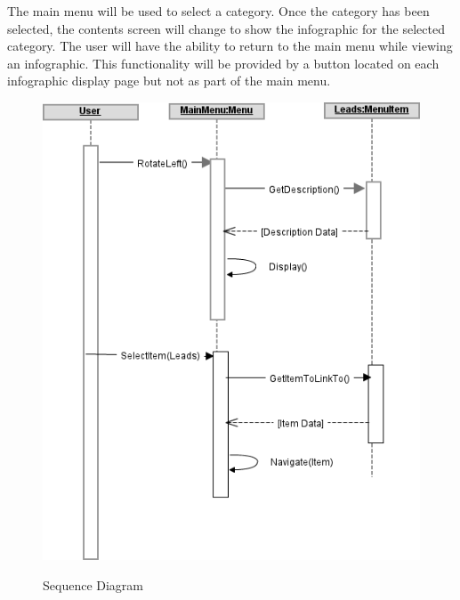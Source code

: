 \documentclass[11pt,a4paper,oneside]{article}
\begin{document}
The main menu will be used to select a category.  Once the category has been selected, the contents screen will change to show the infographic for the selected category.  The user will have the ability to return to the main menu while viewing an infographic.  This functionality will be provided by a button located on each infographic display page but not as part of the main menu.\\

\begin{figure}[!]
\caption{Sequence Diagram}
\includegraphics[width=1\textwidth]{images/Capstone_-_Sequence_Diagram.png}\\
\end{figure}
\end{document}
